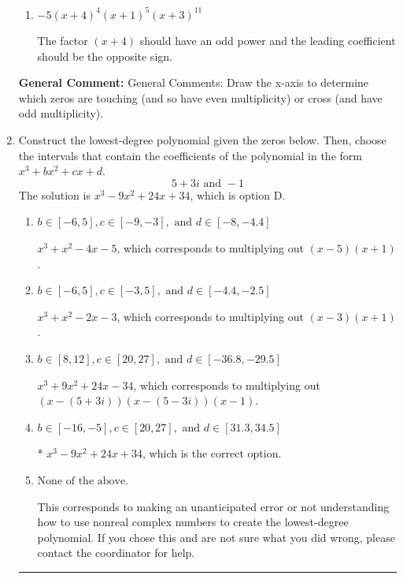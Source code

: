 \documentclass{extbook}[14pt]
\newcommand{\litem}[1]{\item #1

\rule{\textwidth}{0.4pt}}
\begin{document}
\begin{enumerate}
{\begin{enumerate}[label=\Alph*.]
The factor $-4$ should have been an odd power.
\item \( -5(x + 4)^{4} (x + 1)^{5} (x + 3)^{11} \)

The factor $(x + 4)$ should have an odd power and the leading coefficient should be the opposite sign.
\end{enumerate}

\textbf{General Comment:} General Comments: Draw the x-axis to determine which zeros are touching (and so have even multiplicity) or cross (and have odd multiplicity).
}
\litem{
Construct the lowest-degree polynomial given the zeros below. Then, choose the intervals that contain the coefficients of the polynomial in the form $x^3+bx^2+cx+d$.
\[ 5 + 3 i \text{ and } -1 \]
The solution is \( x^{3} -9 x^{2} +24 x + 34 \), which is option D.\begin{enumerate}[label=\Alph*.]
\item \( b \in [-6, 5], c \in [-9, -3], \text{ and } d \in [-8, -4.4] \)

$x^{3} + x^{2} -4 x -5$, which corresponds to multiplying out $(x -5)(x + 1)$.
\item \( b \in [-6, 5], c \in [-3, 5], \text{ and } d \in [-4.4, -2.5] \)

$x^{3} + x^{2} -2 x -3$, which corresponds to multiplying out $(x -3)(x + 1)$.
\item \( b \in [8, 12], c \in [20, 27], \text{ and } d \in [-36.8, -29.5] \)

$x^{3} +9 x^{2} +24 x -34$, which corresponds to multiplying out $(x-(5 + 3 i))(x-(5 - 3 i))(x -1)$.
\item \( b \in [-16, -5], c \in [20, 27], \text{ and } d \in [31.3, 34.5] \)

* $x^{3} -9 x^{2} +24 x + 34$, which is the correct option.
\item \( \text{None of the above.} \)

This corresponds to making an unanticipated error or not understanding how to use nonreal complex numbers to create the lowest-degree polynomial. If you chose this and are not sure what you did wrong, please contact the coordinator for help.
\end{enumerate}

}
\end{enumerate}
\end{document}
